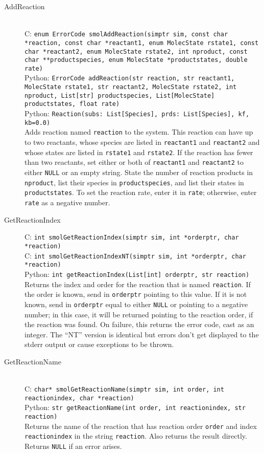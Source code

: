 \documentclass {book}
\newcommand {\ttt} {\texttt}
\begin{document}
\begin{description}

\item[AddReaction]
\hfill \\
C: \ttt{enum ErrorCode smolAddReaction(simptr sim, const char *reaction, const char *reactant1, enum MolecState rstate1, const char *reactant2, enum MolecState rstate2, int nproduct, const char **productspecies, enum MolecState *productstates, double rate)}\\
Python: \ttt{ErrorCode addReaction(str reaction, str reactant1, MolecState rstate1, str reactant2, MolecState rstate2, int nproduct, List[str] productspecies, List[MolecState] productstates, float rate)}\\
Python: \ttt{Reaction(subs: List[Species], prds: List[Species], kf, kb=0.0)}\\
Adds reaction named \ttt{reaction} to the system. This reaction can have up to two reactants, whose species are listed in \ttt{reactant1} and \ttt{reactant2} and whose states are listed in \ttt{rstate1} and \ttt{rstate2}. If the reaction has fewer than two reactants, set either or both of \ttt{reactant1} and \ttt{reactant2} to either \ttt{NULL} or an empty string. State the number of reaction products in \ttt{nproduct}, list their species in \ttt{productspecies}, and list their states in \ttt{productstates}. To set the reaction rate, enter it in \ttt{rate}; otherwise, enter \ttt{rate} as a negative number.

\item[GetReactionIndex]
C: \ttt{int smolGetReactionIndex(simptr sim, int *orderptr, char *reaction)}\\
C: \ttt{int smolGetReactionIndexNT(simptr sim, int *orderptr, char *reaction)}\\
Python: \ttt{int getReactionIndex(List[int] orderptr, str reaction)}\\
Returns the index and order for the reaction that is named \ttt{reaction}. If the order is known, send in \ttt{orderptr} pointing to this value. If it is not known, send in \ttt{orderptr} equal to either \ttt{NULL} or pointing to a negative number; in this case, it will be returned pointing to the reaction order, if the reaction was found. On failure, this returns the error code, cast as an integer. The ``NT'' version is identical but errors don't get displayed to the stderr output or cause exceptions to be thrown.

\item[GetReactionName]
\hfill \\
C: \ttt{char* smolGetReactionName(simptr sim, int order, int reactionindex, char *reaction)}\\
Python: \ttt{str getReactionName(int order, int reactionindex, str reaction)}\\
Returns the name of the reaction that has reaction order \ttt{order} and index \ttt{reactionindex} in the string \ttt{reaction}. Also returns the result directly. Returns \ttt{NULL} if an error arises.


\end{description}
\end{document}

